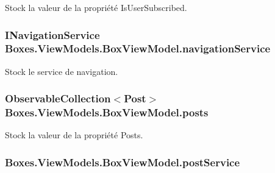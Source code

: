 Stock la valeur de la propriété {\ttfamily Is\+User\+Subscribed}. 

\subsubsection[{\texorpdfstring{navigation\+Service}{navigationService}}]{\setlength{\rightskip}{0pt plus 5cm}I\+Navigation\+Service Boxes.\+View\+Models.\+Box\+View\+Model.\+navigation\+Service\hspace{0.3cm}{\ttfamily [private]}}\hypertarget{class_boxes_1_1_view_models_1_1_box_view_model_adc660c88b5bfb168d08b5866a298c72c}{}\label{class_boxes_1_1_view_models_1_1_box_view_model_adc660c88b5bfb168d08b5866a298c72c}


Stock le service de navigation. 

\subsubsection[{\texorpdfstring{posts}{posts}}]{\setlength{\rightskip}{0pt plus 5cm}Observable\+Collection$<${\bf Post}$>$ Boxes.\+View\+Models.\+Box\+View\+Model.\+posts\hspace{0.3cm}{\ttfamily [private]}}\hypertarget{class_boxes_1_1_view_models_1_1_box_view_model_ab45cdb2108ddd25aa04fe01fe48b4758}{}\label{class_boxes_1_1_view_models_1_1_box_view_model_ab45cdb2108ddd25aa04fe01fe48b4758}


Stock la valeur de la propriété {\ttfamily Posts}. 

\subsubsection[{\texorpdfstring{post\+Service}{postService}}]{ Boxes.\+View\+Models.\+Box\+View\+Model.\+post\+Service\hspace{0.3cm}{\ttfamily [private]}}\hypertarget{class_boxes_1_1_view_models_1_1_box_view_model_a6f7f5373198c65bb2fcaeb11ddcd9437}{}\label{class_boxes_1_1_view_models_1_1_box_view_model_a6f7f5373198c65bb2fcaeb11ddcd9437}


